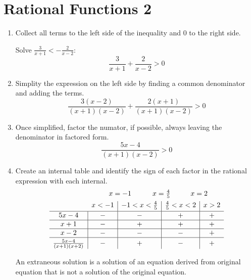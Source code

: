 \section{Rational Functions 2}
\begin{enumerate}
    \item Collect all terms to the left side of the inequality and $0$ to the right side.
        \begin{eg}
            Solve $\frac{3}{x+1}<-\frac{2}{x-2}$:
            \[
                \frac{3}{x+1}+\frac{2}{x-2}>0
            \]
        \end{eg}
    \item Simplity the expression on the left side by finding a common denominator and adding the terms.
        \[
            \frac{3(x-2)}{(x+1)(x-2)}+\frac{2(x+1)}{(x+1)(x-2)}>0
        \]
    \item Once simplified, factor the numator, if possible, always leaving the denominator in factored form.
        \[
            \frac{5x-4}{(x+1)(x-2)}>0
        \]
    \item Create an internal table and identify the sign of each factor in the rational expression with each internal.
        \[
            \begin{array}{c|c|c|c|c}
                \multicolumn{1}{c}{} & \multicolumn{4}{l}{\hspace{2.45em} x=-1 \hspace{3em} x=\frac{4}{5} \hspace{2.85em} x=2} \\[1ex]
                \multicolumn{1}{c}{} & x<-1 & -1<x<\frac{4}{5} & \frac{4}{5}<x<2 & x>2 \\[0.5ex] \hline
                5x-4 & - & - & + & + \\ \hline
                x+1  & - & + & + & + \\ \hline
                x-2  & - & - & - & + \\ \hline\rule{0pt}{2.5ex}
                \frac{5x-4}{(x+1)(x+2)} & - & + & - & +
            \end{array}
        \]
        \begin{note}
            An extraneous solution is a solution of an equation derived from original equation that is not a solution of the original equation.
        \end{note}
\end{enumerate}